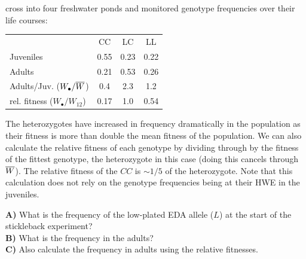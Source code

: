 cross into four freshwater ponds and monitored genotype frequencies
over their life courses: 
\begin{center}
\begin{tabular}{lccc}
 & CC & LC & LL \\
Juveniles & 0.55 & 0.23 & 0.22\\
Adults     & 0.21 & 0.53 & 0.26\\
Adults/Juv. ($W_{\bullet}/\overline{W}$)  & 0.4 & 2.3 & 1.2 \\
rel. fitness ($W_{\bullet}/W_{12}$)  & 0.17 & 1.0 & 0.54 \\
\end{tabular}
\end{center}
 The heterozygotes have increased in frequency dramatically in the
population as their fitness is more than double the mean fitness of
the population. We can also calculate the relative fitness of each
genotype by dividing through by the fitness of the fittest genotype,
the heterozygote in this case (doing this cancels through
$\overline{W}$). The relative fitness of the $CC$ is $\sim 1/5$ of the
heterozygote. Note that this calculation does not rely on the genotype frequencies being at their HWE in the juveniles.

\begin{question}
{\bf A)} What is the frequency of the low-plated EDA allele ($L$) at the start of the stickleback experiment? \\
{\bf B)} What is the frequency in the adults? \\
{\bf C)} Also calculate the frequency in adults using the relative
fitnesses. 
\end{question}




